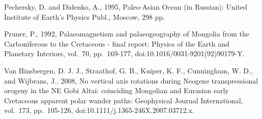 \documentclass[11pt]{article}
\begin{document}
Pechersky, D. and Didenko, A., 1995, Paleo-Asian Ocean (in Russian):
United Institute of Earth's Physics Publ., Moscow, 298 pp.

Pruner, P., 1992, Palaeomagnetism and palaeogeography of Mongolia from
the Carboniferous to the Cretaceous - final report: Physics of the Earth
and Planetary Interiors, vol.~70, pp.~169-177,
doi:10.1016/0031-9201(92)90179-Y.

Van Hinsbergen, D. J. J., Straathof, G. B., Kuiper, K. F., Cunningham,
W. D., and Wijbrans, J., 2008, No vertical axis rotations during Neogene
transpressional orogeny in the NE Gobi Altai: coinciding Mongolian and
Eurasian early Cretaceous apparent polar wander paths: Geophysical
Journal International, vol.~173, pp.~105-126,
doi:10.1111/j.1365-246X.2007.03712.x.




    
    
    
    
\end{document}
